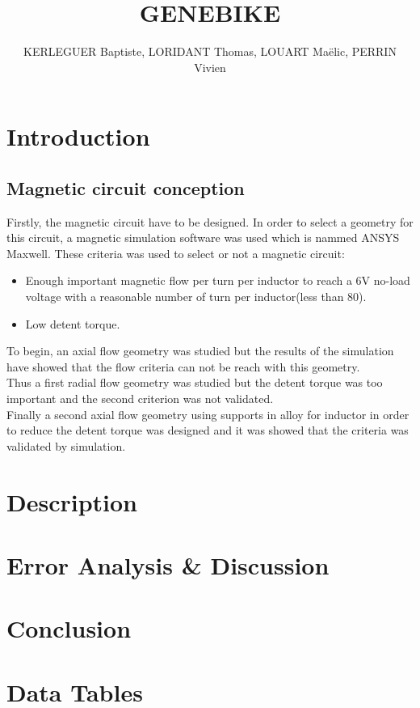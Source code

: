 \documentclass[11pt, titlepage]{article}
\author{KERLEGUER Baptiste, LORIDANT Thomas, LOUART Maëlic, PERRIN Vivien}
\title{GENEBIKE}
\date{\parbox{\linewidth}{}}
\begin{document}
	\maketitle
    \setcounter{tocdepth}{1}
    \section{Introduction}
    \subsection{Magnetic circuit conception}
    \begin{paragraph}
    Firstly, the magnetic circuit have to be designed. In order to select a geometry for this circuit, a magnetic simulation software was used which is nammed ANSYS Maxwell. These criteria was used to select or not a magnetic circuit:
    \begin{itemize}
    \item Enough important magnetic flow per turn per inductor to reach a 6V no-load voltage with a reasonable number of turn per inductor(less than 80).
    \item Low detent torque.
    \end{itemize}
    To begin, an axial flow geometry was studied but the results of the simulation have showed that the flow criteria can not be reach with this geometry.\\
    Thus a first radial flow geometry was studied but the detent torque was too important and the second criterion was not validated.\\
    Finally a second axial flow geometry using supports in alloy for inductor in order to reduce the detent torque was designed and it was showed that the criteria was validated by simulation.
    \end{paragraph}
    \section{Description}
    
    \section{Error Analysis \& Discussion}
    
    \section{Conclusion}
    
    \newpage
   	\section{Data Tables}
    
    
\end{document}
